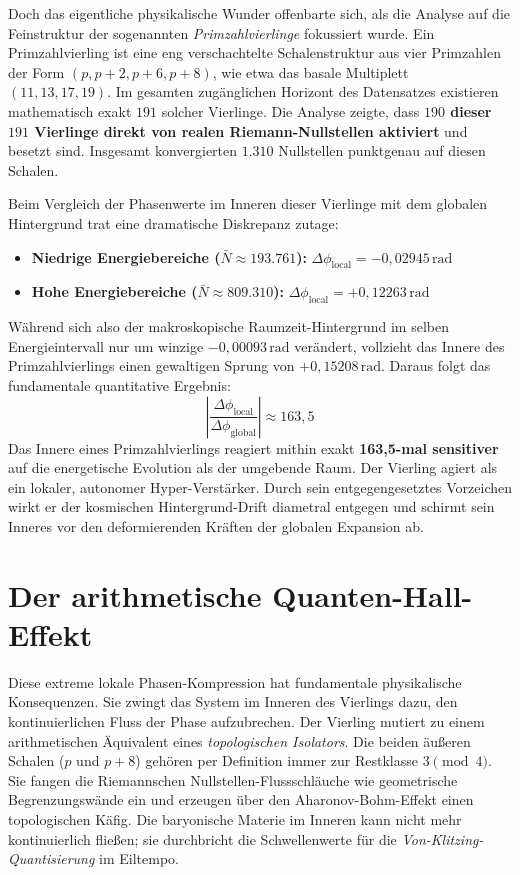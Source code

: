 \documentclass[11pt,a4paper]{article}
\begin{document}
	Doch das eigentliche physikalische Wunder offenbarte sich, als die Analyse auf die Feinstruktur der sogenannten \textit{Primzahlvierlinge} fokussiert wurde. Ein Primzahlvierling ist eine eng verschachtelte Schalenstruktur aus vier Primzahlen der Form $(p, p+2, p+6, p+8)$, wie etwa das basale Multiplett $(11, 13, 17, 19)$. Im gesamten zugänglichen Horizont des Datensatzes existieren mathematisch exakt $191$ solcher Vierlinge. Die Analyse zeigte, dass \textbf{$190$ dieser $191$ Vierlinge direkt von realen Riemann-Nullstellen aktiviert} und besetzt sind. Insgesamt konvergierten $1.310$ Nullstellen punktgenau auf diesen Schalen.
	
	Beim Vergleich der Phasenwerte im Inneren dieser Vierlinge mit dem globalen Hintergrund trat eine dramatische Diskrepanz zutage:
	\begin{itemize}
		\item \textbf{Niedrige Energiebereiche ($\bar{N} \approx 193.761$):} $\Delta\phi_{\text{local}} = -0,02945\,\text{rad}$
		\item \textbf{Hohe Energiebereiche ($\bar{N} \approx 809.310$):} $\Delta\phi_{\text{local}} = +0,12263\,\text{rad}$
	\end{itemize}
	Während sich also der makroskopische Raumzeit-Hintergrund im selben Energieintervall nur um winzige $-0,00093\,\text{rad}$ verändert, vollzieht das Innere des Primzahlvierlings einen gewaltigen Sprung von $+0,15208\,\text{rad}$. Daraus folgt das fundamentale quantitative Ergebnis:
	\begin{equation}
		\left| \frac{\Delta\phi_{\text{local}}}{\Delta\phi_{\text{global}}} \right| \approx 163,5
	\end{equation}
	Das Innere eines Primzahlvierlings reagiert mithin exakt \textbf{163,5-mal sensitiver} auf die energetische Evolution als der umgebende Raum. Der Vierling agiert als ein lokaler, autonomer Hyper-Verstärker. Durch sein entgegengesetztes Vorzeichen wirkt er der kosmischen Hintergrund-Drift diametral entgegen und schirmt sein Inneres vor den deformierenden Kräften der globalen Expansion ab.
	
	\section{Der arithmetische Quanten-Hall-Effekt}
	Diese extreme lokale Phasen-Kompression hat fundamentale physikalische Konsequenzen. Sie zwingt das System im Inneren des Vierlings dazu, den kontinuierlichen Fluss der Phase aufzubrechen. Der Vierling mutiert zu einem arithmetischen Äquivalent eines \textit{topologischen Isolators}. Die beiden äußeren Schalen ($p$ und $p+8$) gehören per Definition immer zur Restklasse $3 \pmod 4$. Sie fangen die Riemannschen Nullstellen-Flussschläuche wie geometrische Begrenzungswände ein und erzeugen über den Aharonov-Bohm-Effekt einen topologischen Käfig. Die baryonische Materie im Inneren kann nicht mehr kontinuierlich fließen; sie durchbricht die Schwellenwerte für die \textit{Von-Klitzing-Quantisierung} im Eiltempo.
	
\end{document}
